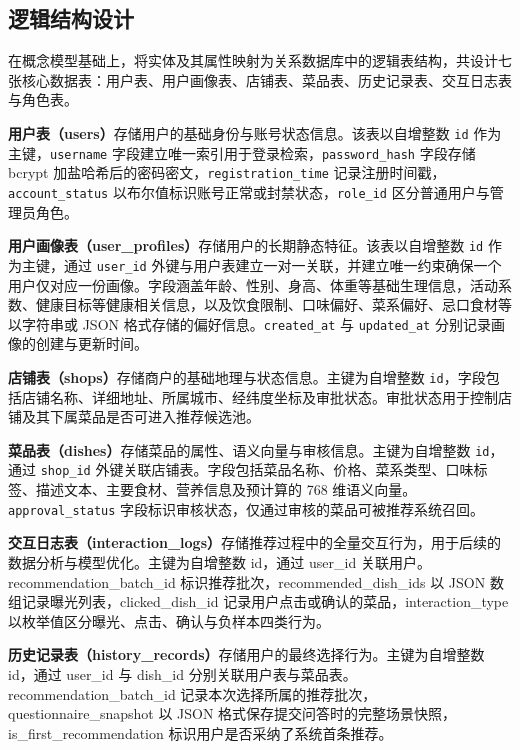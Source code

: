 \subsection{逻辑结构设计}

在概念模型基础上，将实体及其属性映射为关系数据库中的逻辑表结构，共设计七张核心数据表：用户表、用户画像表、店铺表、菜品表、历史记录表、交互日志表与角色表。

\textbf{用户表（users）}存储用户的基础身份与账号状态信息。该表以自增整数 \texttt{id} 作为主键，\texttt{username} 字段建立唯一索引用于登录检索，\texttt{password\_hash} 字段存储 bcrypt 加盐哈希后的密码密文，\texttt{registration\_time} 记录注册时间戳，\texttt{account\_status} 以布尔值标识账号正常或封禁状态，\texttt{role\_id} 区分普通用户与管理员角色。

\textbf{用户画像表（user\_profiles）}存储用户的长期静态特征。该表以自增整数 \texttt{id} 作为主键，通过 \texttt{user\_id} 外键与用户表建立一对一关联，并建立唯一约束确保一个用户仅对应一份画像。字段涵盖年龄、性别、身高、体重等基础生理信息，活动系数、健康目标等健康相关信息，以及饮食限制、口味偏好、菜系偏好、忌口食材等以字符串或 JSON 格式存储的偏好信息。\texttt{created\_at} 与 \texttt{updated\_at} 分别记录画像的创建与更新时间。

\textbf{店铺表（shops）}存储商户的基础地理与状态信息。主键为自增整数 \texttt{id}，字段包括店铺名称、详细地址、所属城市、经纬度坐标及审批状态。审批状态用于控制店铺及其下属菜品是否可进入推荐候选池。

\textbf{菜品表（dishes）}存储菜品的属性、语义向量与审核信息。主键为自增整数 \texttt{id}，通过 \texttt{shop\_id} 外键关联店铺表。字段包括菜品名称、价格、菜系类型、口味标签、描述文本、主要食材、营养信息及预计算的 768 维语义向量。\texttt{approval\_status} 字段标识审核状态，仅通过审核的菜品可被推荐系统召回。

{\sloppy\textbf{交互日志表（interaction\_logs）}存储推荐过程中的全量交互行为，用于后续的数据分析与模型优化。主键为自增整数 {\ttfamily id}，通过 {\ttfamily user\_id} 关联用户。{\ttfamily recommendation\allowbreak\_batch\allowbreak\_id} 标识推荐批次，{\ttfamily recommended\allowbreak\_dish\allowbreak\_ids} 以 JSON 数组记录曝光列表，{\ttfamily clicked\allowbreak\_dish\allowbreak\_id} 记录用户点击或确认的菜品，{\ttfamily interaction\allowbreak\_type} 以枚举值区分曝光、点击、确认与负样本四类行为。}

{\sloppy\textbf{历史记录表（history\_records）}存储用户的最终选择行为。主键为自增整数 {\ttfamily id}，通过 {\ttfamily user\_id} 与 {\ttfamily dish\_id} 分别关联用户表与菜品表。{\ttfamily recommendation\allowbreak\_batch\allowbreak\_id} 记录本次选择所属的推荐批次，{\ttfamily questionnaire\allowbreak\_snapshot} 以 JSON 格式保存提交问答时的完整场景快照，{\ttfamily is\allowbreak\_first\allowbreak\_recommendation} 标识用户是否采纳了系统首条推荐。}

